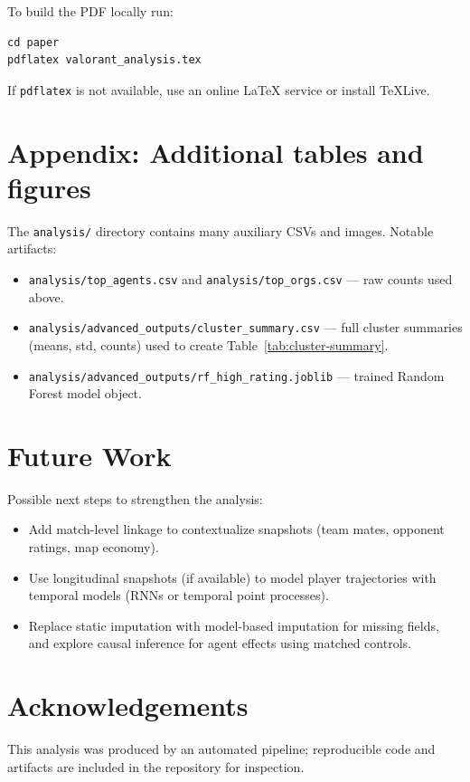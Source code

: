 \documentclass[11pt]{article}
\begin{document}
To build the PDF locally run:
\begin{verbatim}
cd paper
pdflatex valorant_analysis.tex
\end{verbatim}

If \texttt{pdflatex} is not available, use an online LaTeX service or install TeXLive.

\section{Appendix: Additional tables and figures}
The \texttt{analysis/} directory contains many auxiliary CSVs and images. Notable artifacts:
\begin{itemize}
  \item \texttt{analysis/top\_agents.csv} and \texttt{analysis/top\_orgs.csv} — raw counts used above.
  \item \texttt{analysis/advanced\_outputs/cluster\_summary.csv} — full cluster summaries (means, std, counts) used to create Table~\ref{tab:cluster-summary}.
  \item \texttt{analysis/advanced\_outputs/rf\_high\_rating.joblib} — trained Random Forest model object.
\end{itemize}

\section{Future Work}
Possible next steps to strengthen the analysis:
\begin{itemize}
  \item Add match-level linkage to contextualize snapshots (team mates, opponent ratings, map economy).
  \item Use longitudinal snapshots (if available) to model player trajectories with temporal models (RNNs or temporal point processes).
  \item Replace static imputation with model-based imputation for missing fields, and explore causal inference for agent effects using matched controls.
\end{itemize}

\section*{Acknowledgements}
This analysis was produced by an automated pipeline; reproducible code and artifacts are included in the repository for inspection.
\end{document}
